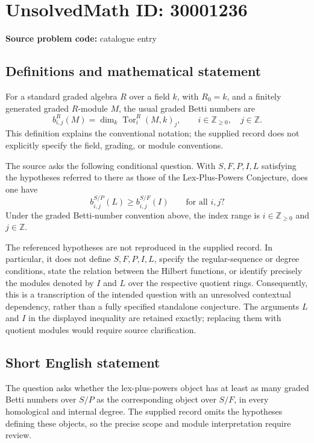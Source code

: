 \documentclass[11pt]{article}
\newcommand{\Z}{\mathbb{Z}}
\begin{document}
\section*{UnsolvedMath ID: 30001236}
\textbf{Source problem code:} catalogue entry
\subsection{Definitions and mathematical statement}
For a standard graded algebra \(R\) over a field \(k\), with \(R_0=k\), and a finitely generated graded \(R\)-module \(M\), the usual graded Betti numbers are
\[
 b^R_{i,j}(M)=\dim_k\operatorname{Tor}^R_i(M,k)_j,
 \qquad i\in\Z_{\geq 0},\quad j\in\Z.
\]
This definition explains the conventional notation; the supplied record does not explicitly specify the field, grading, or module conventions.

The source asks the following conditional question. With \(S,F,P,I,L\) satisfying the hypotheses referred to there as those of the Lex-Plus-Powers Conjecture, does one have
\[
 b_{i,j}^{S/P}(L)\geq b_{i,j}^{S/F}(I)
 \qquad\text{for all }i,j?
\]
Under the graded Betti-number convention above, the index range is \(i\in\Z_{\geq0}\) and \(j\in\Z\).

The referenced hypotheses are not reproduced in the supplied record. In particular, it does not define \(S,F,P,I,L\), specify the regular-sequence or degree conditions, state the relation between the Hilbert functions, or identify precisely the modules denoted by \(I\) and \(L\) over the respective quotient rings. Consequently, this is a transcription of the intended question with an unresolved contextual dependency, rather than a fully specified standalone conjecture. The arguments \(L\) and \(I\) in the displayed inequality are retained exactly; replacing them with quotient modules would require source clarification.
\subsection{Short English statement}
The question asks whether the lex-plus-powers object has at least as many graded Betti numbers over \(S/P\) as the corresponding object over \(S/F\), in every homological and internal degree. The supplied record omits the hypotheses defining these objects, so the precise scope and module interpretation require review.
\end{document}
